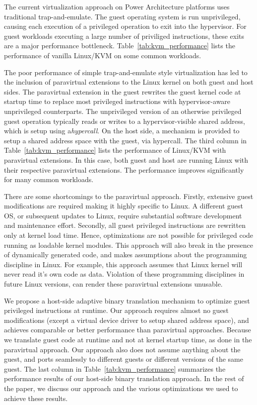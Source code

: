 \documentclass[10pt,twocolumn]{article}
\begin{document}
The current virtualization approach on Power Architecture platforms uses traditional
trap-and-emulate. The guest operating system is run unprivileged, causing each
execution of a privileged
operation to exit into the hypervisor. For guest workloads executing a large number
of priviliged instructions, these exits are a major performance
bottleneck. Table~\ref{tab:kvm_performance} lists the performance of vanilla Linux/KVM
on some common workloads.

The poor performance of simple trap-and-emulate style virtualization has led to
the inclusion of paravirtual extensions to the Linux kernel on both
guest and host sides. The paravirtual extension in the guest rewrites the guest kernel
code at startup time to replace most privileged instructions with
hypervisor-aware unprivileged counterparts. The unprivileged version of an
otherwise privileged guest operation typically reads or writes to a hypervisor-visible
shared address, which is setup using a{\em hypercall}.
On the host side, a mechanism is provided to setup a shared address space with the guest,
via hypercall. The third column in
Table~\ref{tab:kvm_performance} lists the performance of Linux/KVM with paravirtual
extensions. In this case, both guest and host are running Linux with their respective
paravirtual extensions. The performance improves significantly for many common
workloads.

There are some shortcomings to the paravirtual approach. Firstly, extensive guest
modifications are required making it highly specific to Linux. A different
guest OS, or subsequent updates to Linux, require substantial software
development and maintenance effort. Secondly, all guest
privileged instructions are rewritten only at kernel load time. Hence,
optimizations are
not possible for privileged code running as loadable kernel modules. This
approach will also break in the presence of dynamically generated code, and makes
assumptions about the programming discipline in Linux. For example, this approach
assumes that Linux kernel will never read it's own code as data. Violation of
these programming disciplines in future Linux versions, can render these paravirtual
extensions unusable.

We propose a host-side adaptive binary translation mechanism to optimize guest
privileged instructions at runtime. Our approach requires almost no guest modifications
(except a virtual device driver to setup shared address space), and achieves
comparable or better performance than paravirtual approaches. Because we translate
guest code at runtime and not at kernel startup time, as done in the paravirtual
approach. Our approach also
does not assume anything about the guest, and ports seamlessly to different
guests or different versions of the same guest.
The last column in Table~\ref{tab:kvm_performance} summarizes the performance results of
our host-side binary translation approach. In the rest of the paper, we discuss
our approach and the various optimizations we used to achieve these results.
\end{document}
